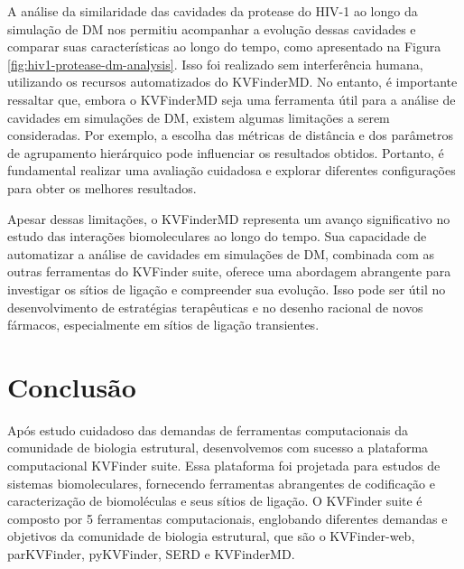 \documentclass[Portugues]{phdquali}
\begin{document}
A análise da similaridade das cavidades da protease do HIV-1 ao longo da simulação de DM nos permitiu acompanhar a evolução dessas cavidades e comparar suas características ao longo do tempo, como apresentado na Figura \ref{fig:hiv1-protease-dm-analysis}. Isso foi realizado sem interferência humana, utilizando os recursos automatizados do KVFinderMD. No entanto, é importante ressaltar que, embora o KVFinderMD seja uma ferramenta útil para a análise de cavidades em simulações de DM, existem algumas limitações a serem consideradas. Por exemplo, a escolha das métricas de distância e dos parâmetros de agrupamento hierárquico pode influenciar os resultados obtidos. Portanto, é fundamental realizar uma avaliação cuidadosa e explorar diferentes configurações para obter os melhores resultados. %

Apesar dessas limitações, o KVFinderMD representa um avanço significativo no estudo das interações biomoleculares ao longo do tempo. Sua capacidade de automatizar a análise de cavidades em simulações de DM, combinada com as outras ferramentas do KVFinder suite, oferece uma abordagem abrangente para investigar os sítios de ligação e compreender sua evolução. Isso pode ser útil no desenvolvimento de estratégias terapêuticas e no desenho racional de novos fármacos, especialmente em sítios de ligação transientes.



\chapter{Conclusão}

Após estudo cuidadoso das demandas de ferramentas computacionais da comunidade de biologia estrutural, desenvolvemos com sucesso a plataforma computacional KVFinder suite. Essa plataforma foi projetada para estudos de sistemas biomoleculares, fornecendo ferramentas abrangentes de codificação e caracterização de biomoléculas e seus sítios de ligação. O KVFinder suite é composto por 5 ferramentas computacionais, englobando diferentes demandas e objetivos da comunidade de biologia estrutural, que são o KVFinder-web, parKVFinder, pyKVFinder, SERD e KVFinderMD. 
\end{document}
